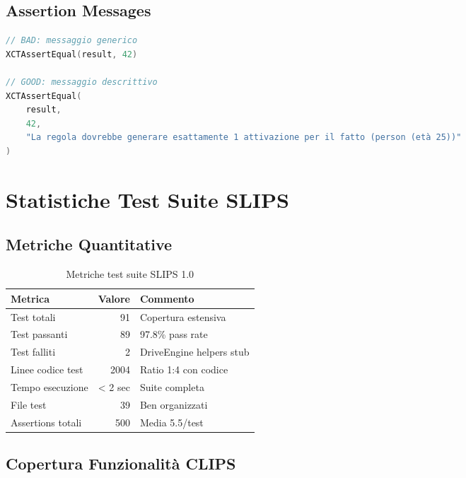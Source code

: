 \subsection{Assertion Messages}

\begin{lstlisting}[language=Swift]
// BAD: messaggio generico
XCTAssertEqual(result, 42)

// GOOD: messaggio descrittivo
XCTAssertEqual(
    result,
    42,
    "La regola dovrebbe generare esattamente 1 attivazione per il fatto (person (età 25))"
)
\end{lstlisting}

\section{Statistiche Test Suite SLIPS}

\subsection{Metriche Quantitative}

\begin{table}[h]
\centering
\begin{tabular}{@{}lrl@{}}
\toprule
\textbf{Metrica} & \textbf{Valore} & \textbf{Commento} \\
\midrule
Test totali & 91 & Copertura estensiva \\
Test passanti & 89 & 97.8\% pass rate \\
Test falliti & 2 & DriveEngine helpers stub \\
Linee codice test & 2004 & Ratio 1:4 con codice \\
Tempo esecuzione & < 2 sec & Suite completa \\
File test & 39 & Ben organizzati \\
Assertions totali & ~500 & Media 5.5/test \\
\bottomrule
\end{tabular}
\caption{Metriche test suite SLIPS 1.0}
\label{tab:test_stats}
\end{table}

\subsection{Copertura Funzionalità CLIPS}

